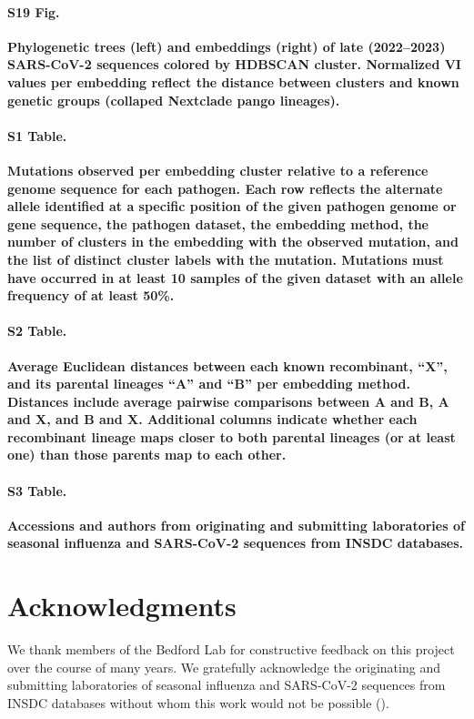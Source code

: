 \documentclass[10pt,letterpaper]{article}
\begin{document}
\paragraph*{S19 Fig.}
\label{S19_Fig_sarscov2_late_embeddings_by_cluster_vs_Nextclade_pango}
{\bf Phylogenetic trees (left) and embeddings (right) of late (2022--2023) SARS-CoV-2 sequences colored by HDBSCAN cluster.
  Normalized VI values per embedding reflect the distance between clusters and known genetic groups (collaped Nextclade pango lineages).}

\paragraph*{S1 Table.}
\label{S1_Table}
{\bf Mutations observed per embedding cluster relative to a reference genome sequence for each pathogen. Each row reflects the alternate allele identified at a specific position of the given pathogen genome or gene sequence, the pathogen dataset, the embedding method, the number of clusters in the embedding with the observed mutation, and the list of distinct cluster labels with the mutation. Mutations must have occurred in at least 10 samples of the given dataset with an allele frequency of at least 50\%.}

\paragraph*{S2 Table.}
\label{S2_Table}
{\bf Average Euclidean distances between each known recombinant, ``X'', and its parental lineages ``A'' and ``B'' per embedding method. Distances include average pairwise comparisons between A and B, A and X, and B and X. Additional columns indicate whether each recombinant lineage maps closer to both parental lineages (or at least one) than those parents map to each other.}

\paragraph*{S3 Table.}
\label{S3_Table}
{\bf Accessions and authors from originating and submitting laboratories of seasonal influenza and SARS-CoV-2 sequences from INSDC databases.}

\section*{Acknowledgments}

We thank members of the Bedford Lab for constructive feedback on this project over the course of many years.
We gratefully acknowledge the originating and submitting laboratories of seasonal influenza and SARS-CoV-2 sequences from INSDC databases without whom this work would not be possible ().
\end{document}
